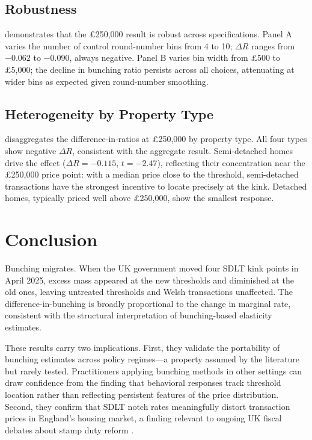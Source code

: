 \documentclass[12pt]{article}
\begin{document}


\subsection{Robustness}

 demonstrates that the \pounds 250,000 result is robust across specifications. Panel A varies the number of control round-number bins from 4 to 10; $\Delta R$ ranges from $-0.062$ to $-0.090$, always negative. Panel B varies bin width from \pounds 500 to \pounds 5,000; the decline in bunching ratio persists across all choices, attenuating at wider bins as expected given round-number smoothing.



\subsection{Heterogeneity by Property Type}

 disaggregates the difference-in-ratios at \pounds 250,000 by property type. All four types show negative $\Delta R$, consistent with the aggregate result. Semi-detached homes drive the effect ($\Delta R = -0.115$, $t = -2.47$), reflecting their concentration near the \pounds 250,000 price point: with a median price close to the threshold, semi-detached transactions have the strongest incentive to locate precisely at the kink. Detached homes, typically priced well above \pounds 250,000, show the smallest response.




\section{Conclusion}\label{sec:conclusion}

Bunching migrates. When the UK government moved four SDLT kink points in April 2025, excess mass appeared at the new thresholds and diminished at the old ones, leaving untreated thresholds and Welsh transactions unaffected. The difference-in-bunching is broadly proportional to the change in marginal rate, consistent with the structural interpretation of bunching-based elasticity estimates.

These results carry two implications. First, they validate the portability of bunching estimates across policy regimes---a property assumed by the literature but rarely tested. Practitioners applying bunching methods in other settings can draw confidence from the finding that behavioral responses track threshold location rather than reflecting persistent features of the price distribution. Second, they confirm that SDLT notch rates meaningfully distort transaction prices in England's housing market, a finding relevant to ongoing UK fiscal debates about stamp duty reform \citep{hilber2016impact, advani2023stamp}.
\end{document}
